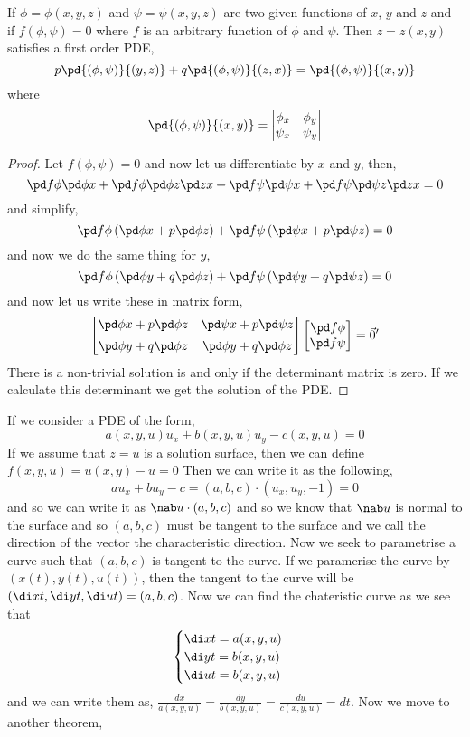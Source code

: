 \begin{nthm}[]
  If $\phi = \phi(x, y, z)$ and $\psi = \psi(x, y, z)$ are two given functions of $x$, $y$ and $z$ and if $f(\phi, \psi) = 0$ where $f$ is an arbitrary function of $\phi$ and $\psi$. Then $z = z(x, y)$ satisfies a first order PDE,
  $$ p\pd{(\phi, \psi)}{(y, z)} + q\pd{(\phi, \psi)}{(z, x)} = \pd{(\phi, \psi)}{(x, y)} $$
  where
  $$ \pd{(\phi, \psi)}{(x, y)} = \left| \begin{matrix}
    \phi_x & \phi_y \\ \psi_x & \psi_y
  \end{matrix} \right| $$
\end{nthm}
\begin{proof}
  Let $f(\phi, \psi) = 0$ and now let us differentiate by $x$ and $y$, then,
  $$ \pd f \phi \pd \phi x + \pd f \phi\pd \phi z \pd z x + \pd f \psi \pd \psi x + \pd f \psi \pd \psi z \pd z x = 0 $$
  and simplify,
  $$ \pd f \phi \left( \pd \phi x + p\pd \phi z \right) + \pd f \psi \left(\pd \psi x + p\pd \psi z\right) = 0 $$
  and now we do the same thing for $y$,
  $$ \pd f \phi \left( \pd \phi y + q\pd \phi z \right) + \pd f \psi \left( \pd \psi y + q\pd \psi z\right) = 0 $$
  and now let us write these in matrix form,
  $$ \begin{bmatrix}
    \pd \phi x + p\pd \phi z & \pd \psi x + p\pd \psi z\\[5pt]
    \pd \phi y + q\pd \phi z & \pd \phi y + q\pd \phi z
  \end{bmatrix}\begin{bmatrix}
    \pd f \phi \\ \pd f \psi
  \end{bmatrix} = \vec 0'$$
  There is a non-trivial solution is and only if the  determinant matrix is zero. If we calculate this determinant we get the solution of the PDE.
\end{proof}

\noindent
If we consider a PDE of the form,
$$ a(x, y, u)u_x + b(x, y, u)u_y - c(x, y, u) = 0 $$
If we assume that $z = u$ is a solution surface, then we can define $f(x, y, u) = u(x, y) - u = 0$
Then we can write it as the following,
$$ au_x + bu_y - c = (a, b, c) \cdot (u_x, u_y, -1) = 0 $$
and so we can write it as $\nab u \cdot (a, b, c)$ and so we know that $\nab u$ is normal to the surface and so $(a, b, c)$ must be tangent to the surface and we call the direction of the vector the characteristic direction. Now we seek to parametrise a curve such that $(a, b, c)$ is tangent to the curve. If we paramerise the curve by $(x(t), y(t), u(t))$, then the tangent to the curve will be $(\di x t, \di y t, \di u t) = (a, b, c)$. Now we can find the chateristic curve as we see that
$$ \begin{cases}
  \di x t = a(x, y, u)\\
  \di y t = b(x, y, u)\\
  \di u t = b(x, y, u)
\end{cases} $$
and we can write them as, $\frac{dx}{a(x, y, u)} = \frac{dy}{b(x, y, u)} = \frac{du}{c(x, y, u)} = dt$. Now we move to another theorem,

